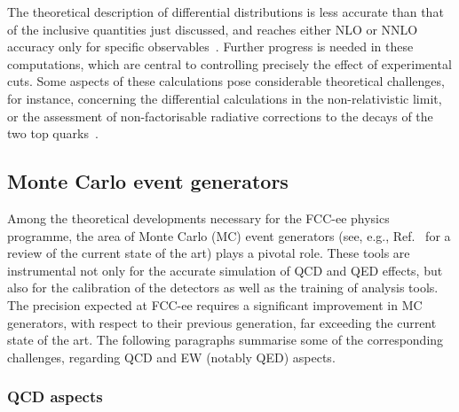 The theoretical description of differential distributions is less accurate than that of the inclusive quantities just discussed, 
and reaches either NLO or NNLO accuracy only for specific observables~\cite{Hoang:1999zc,Bach:2017ggt}.
Further progress is needed in these computations, which are central to controlling precisely the effect of experimental cuts. 
Some aspects of these calculations pose considerable theoretical challenges, 
for instance, concerning the differential calculations in the non-relativistic limit, 
or the assessment of non-factorisable radiative corrections to the decays of the two top quarks~\cite{Melnikov:1995fx}.

\subsection{Monte Carlo event generators}

Among the theoretical developments necessary for the FCC-ee physics programme, 
the area of Monte Carlo (MC) event generators 
(see, e.g., Ref.~\cite{Campbell:2022qmc} for a review of the current state of the art) 
plays a pivotal role.
These tools are instrumental not only for the accurate simulation of QCD and QED effects,
but also for the calibration of the detectors as well as the training of analysis tools.
The precision expected at FCC-ee requires a significant improvement in MC generators, with respect to their previous generation,
far exceeding the current state of the art.
The following paragraphs summarise some of the corresponding challenges, regarding QCD and EW (notably QED) aspects.

\subsubsection{QCD aspects}
\label{sec:QCDmc}

